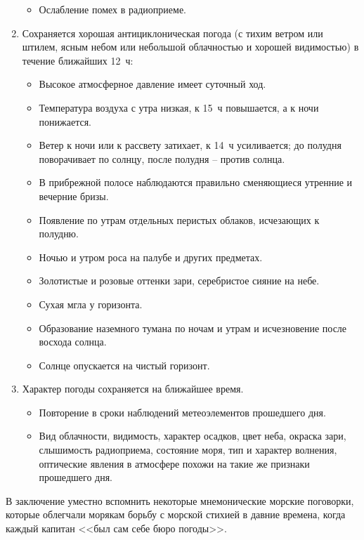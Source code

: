 \documentclass[a4paper, 12pt, twoside, final, book, russian, fittopage, cyremdash]{ncc}
\begin{document}
\begin{enumerate}
\begin{itemize}
  \item Ослабление помех в радиоприеме.
  \end{itemize}
\item Сохраняется хорошая антициклоническая погода (с тихим ветром или штилем, ясным небом или небольшой облачностью и хорошей видимостью) в течение ближайших 12~ч:
  \begin{itemize}
  \item Высокое атмосферное давление имеет суточный ход.
  \item Температура воздуха с утра низкая, к 15~ч повышается, а к ночи понижается.
  \item Ветер к ночи или к рассвету затихает, к 14~ч усиливается; до полудня поворачивает по солнцу, после полудня \--- против солнца.
  \item В прибрежной полосе наблюдаются правильно сменяющиеся утренние и вечерние бризы.
  \item Появление по утрам отдельных перистых облаков, исчезающих к полудню.
  \item Ночью и утром роса на палубе и других предметах.
  \item Золотистые и розовые оттенки зари, серебристое сияние на небе.
  \item Сухая мгла у горизонта.
  \item Образование наземного тумана по ночам и утрам и исчезновение после восхода солнца.
  \item Солнце опускается на чистый горизонт.
  \end{itemize}
\item Характер погоды сохраняется на ближайшее время.
  \begin{itemize}
  \item Повторение в сроки наблюдений метеоэлементов прошедшего дня.
  \item Вид облачности, видимость, характер осадков, цвет неба, окраска зари, слышимость радиоприема, состояние моря, тип и характер волнения, оптические явления в атмосфере похожи на такие же признаки прошедшего дня.
  \end{itemize}
\end{enumerate}

В заключение уместно вспомнить некоторые мнемонические морские поговорки, которые облегчали морякам борьбу с морской стихией в давние времена, когда каждый капитан <<был сам себе бюро погоды>>.
\end{document}
